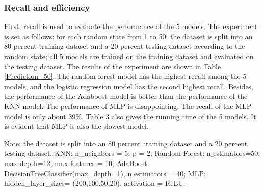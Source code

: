 \documentclass[12pt]{article}
\begin{document}
\subsubsection{Recall and efficiency}
First, recall is used to evaluate the performance of the 5 models. The experiment is set as follows: for each random state from 1 to 50: the dataset is split into an 80 percent training dataset and a 20 percent testing dataset according to the random state; all 5 models are trained on the training dataset and evaluated on the testing dataset. The results of the experiment are shown in Table \ref{Prediction_50}. The random forest model has the highest recall among the 5 models, and the logistic regression model has the second highest recall. Besides, the performance of the Adaboost model is better than the performance of the KNN model. The performance of MLP is disappointing. The recall of the MLP model is only about 39\%. Table 3 also gives the running time of the 5 models. It is evident that MLP is also the slowest model.
\begin{table}[htbp]
    \centering
    \caption{Performance of the 5 models} \label{Prediction_50}
      \begin{flushleft}{
      Note: the dataset is split into an 80 percent training
      dataset and a 20 percent testing dataset. KNN: n\_neighbors = 5; p = 2; Random Forest: n$\_$estimators=50, max$\_$depth=12, max$\_$features = 10; AdaBoost: DecisionTreeClassifier(max\_depth=1), n$\_$estimators = 40; MLP: hidden\_layer\_sizes= (200,100,50,20), activation = ReLU.
  }\end{flushleft}
  \end{table}%
\end{document}
